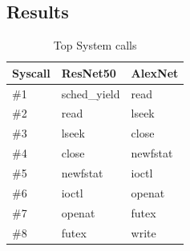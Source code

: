 \documentclass[conference]{IEEEtran}
\begin{document}
\subsection{Results}

\begin{table}
    \begin{center}
        \begin{tabular}[c]{|l|l|l|}
            \hline
            \rowcolor{gray}
            Syscall & ResNet50 & AlexNet\\
            \hline
            \rowcolor{lightgray}
            \#1 & sched\_yield & read\\
            \hline
            \#2 & read & lseek\\
            \hline
            \rowcolor{lightgray}
            \#3 & lseek & close\\
            \hline
            \#4 & close & newfstat\\
            \hline
            \rowcolor{lightgray}
            \#5 & newfstat & ioctl\\
            \hline
            \#6 & ioctl & openat\\
            \hline
            \rowcolor{lightgray}
            \#7 & openat & futex\\
            \hline
            \#8 & futex & write\\
            \hline
        \end{tabular}
    \end{center}
    \caption{Top System calls}\label{tab:syscalls}
\end{table}
\end{document}
